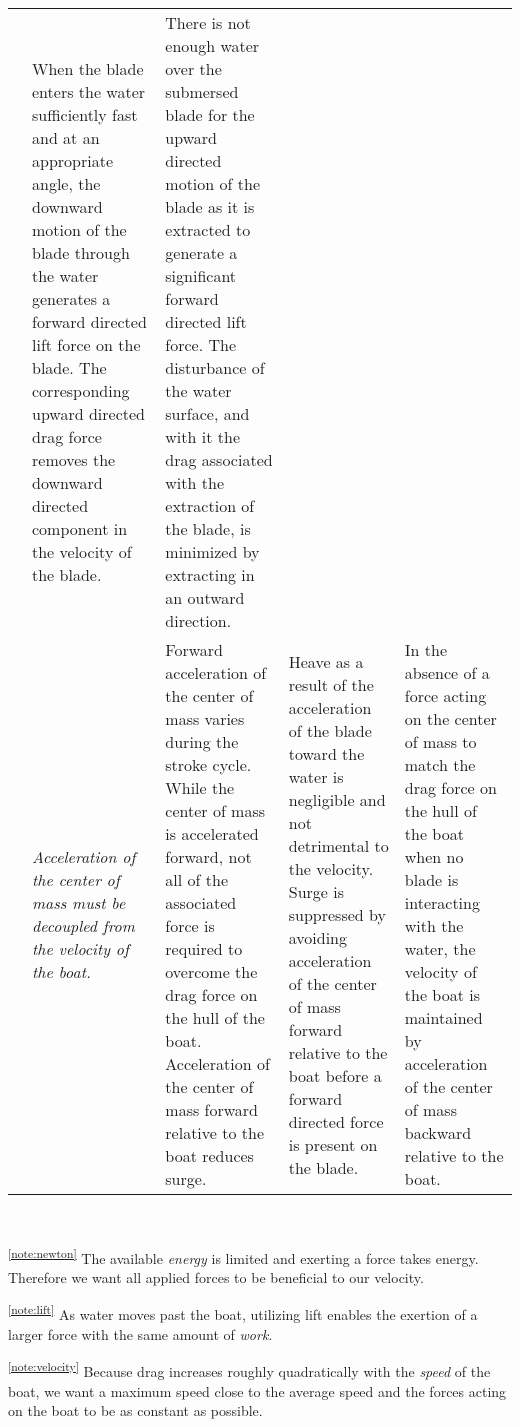\documentclass[a4paper,landscape]{article}
\newcounter{innernote}
\newcommand{\note}[1]{{\refstepcounter{innernote}\label{note:#1}\textsuperscript{\theinnernote}}}
\newcommand{\noteref}[1]{\textsuperscript{\ref{note:#1}}}
\begin{document}
\begin{tabularx}{\textwidth}{cp{9.7em}*{3}{|X}}
	& When the blade enters the water sufficiently fast and at an appropriate angle, the downward motion of the blade through the water generates a forward directed lift force on the blade.
	  The corresponding upward directed drag force removes the downward directed component in the velocity of the blade.
	& There is not enough water over the submersed blade for the upward directed motion of the blade as it is extracted to generate a significant forward directed lift force.
	  The disturbance of the water surface, and with it the drag associated with the extraction of the blade, is minimized by extracting in an outward direction. \\
& \emph{Acceleration of the center of mass must be decoupled from the velocity of the boat.}\note{velocity}
	& Forward acceleration of the center of mass varies during the stroke cycle.
	  While the center of mass is accelerated forward, not all of the associated force is required to overcome the drag force on the hull of the boat.
	  Acceleration of the center of mass forward relative to the boat reduces surge.
	& Heave as a result of the acceleration of the blade toward the water is negligible and not detrimental to the velocity.
	  Surge is suppressed by avoiding acceleration of the center of mass forward relative to the boat before a forward directed force is present on the blade.
	& In the absence of a force acting on the center of mass to match the drag force on the hull of the boat when no blade is interacting with the water, the velocity of the boat is maintained by acceleration of the center of mass backward relative to the boat.
\end{tabularx} \\[10pt]
\small{
\noteref{newton}
The available \emph{energy} is limited and exerting a force takes energy.
Therefore we want all applied forces to be beneficial to our velocity.

\noteref{lift}
As water moves past the boat, utilizing lift enables the exertion of a larger force with the same amount of \emph{work}.

\noteref{velocity}
Because drag increases roughly quadratically with the \emph{speed} of the boat, we want a maximum speed close to the average speed and the forces acting on the boat to be as constant as possible.
}
\end{document}
